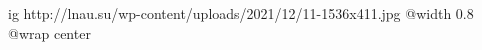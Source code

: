  
 
 
 
 

\ifcmt
  ig http://lnau.su/wp-content/uploads/2021/12/11-1536x411.jpg
  @width 0.8
	@wrap center
\fi
